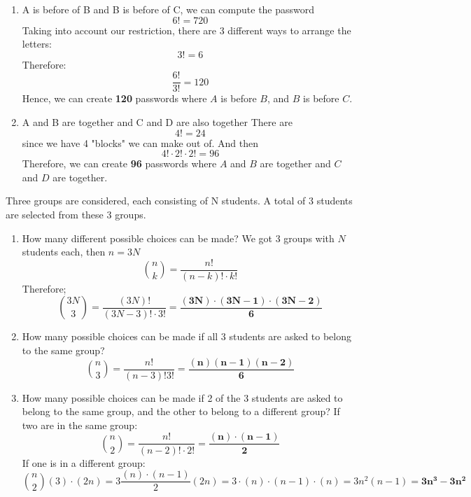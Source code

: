 \documentclass{article}
\begin{document}
\begin{minipage}{\linewidth}
\begin{solutions}
\begin{enumerate}[label=\alph*)]
                \item A is before of B and B is before of C, we can compute the password
                \[
                    6! = 720
                \]
                Taking into account our restriction, there are 3 different ways to arrange the letters: 
                \[
                    3! = 6
                \]
                Therefore:
                \[
                    \frac{6!}{3!} = 120
                \]
                Hence, we can create \textbf{120} passwords where $A$ is before $B$, and $B$ is before $C$.
                \item A and B are together and C and D are also together
                There are 
                \[
                    4! = 24
                \]
                since we have 4 "blocks" we can make out of. And then
                \[
                    4! \cdot 2! \cdot 2! = 96
                \]
                Therefore, we can create \textbf{96} passwords where $A$ and $B$ are together and $C$ and $D$ are together.
            \end{enumerate}
            \medskip
        \end{solutions}
    \end{minipage}
        \begin{solutions}
            Three groups are considered, each consisting of N students. A total of 3 students are selected from these 3 groups.
            \begin{enumerate}[label=\alph*)]
                \item How many different possible choices can be made?
                We got 3 groups with $N$ students each, then $n = 3N$
                \[
                    \binom{n}{k} = \frac{n!}{(n-k)! \cdot k!}
                \]
                Therefore;
                \[
                    \binom{3N}{3} = \frac{(3N)!}{(3N-3)! \cdot 3!} = \frac{\mathbf{(3N)\cdot(3N-1)\cdot(3N-2)}}{\mathbf{6}}
                \]

                \item How many possible choices can be made if all 3 students are asked to belong to the same group?
                \[
                    \binom{n}{3} = \frac{n!}{(n-3)!3!}= \frac{\mathbf{(n)(n-1)(n-2)}}{\mathbf{6}}
                \]

                \item How many possible choices can be made if 2 of the 3 students are asked to belong to the same group, and the other to belong to a different group?
                If two are in the same group:
                \[
                    \binom{n}{2} = \frac{n!}{(n-2)! \cdot 2!} = \frac{\mathbf{(n) \cdot (n-1)}}{\mathbf{2}}
                \]
                If one is in a different group:
                \[
                    \binom{n}{2} (3) \cdot (2n) = 3 \frac{(n) \cdot (n - 1)}{2} (2n) =
                    3 \cdot (n) \cdot (n-1) \cdot (n) = 3n^2(n-1) = \mathbf{3n^3 - 3n^2}
                \]
            \end{enumerate}
        \end{solutions}
\end{document}
